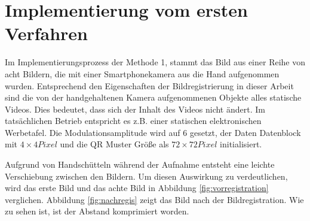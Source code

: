 \section{Implementierung vom ersten Verfahren}
Im Implementierungsprozess der Methode 1, stammt das Bild aus einer Reihe von acht Bildern, die mit einer Smartphonekamera aus die Hand aufgenommen wurden. Entsprechend den Eigenschaften der Bildregistrierung in dieser Arbeit sind die von der handgehaltenen Kamera aufgenommenen Objekte alles statische Videos. Dies bedeutet, dass sich der Inhalt des Videos nicht ändert. Im tatsächlichen Betrieb entspricht es z.B. einer statischen elektronischen Werbetafel. Die Modulationsamplitude wird auf 6 gesetzt, der Daten Datenblock mit $ 4 \times 4 Pixel$ und die QR Muster Größe als $ 72 \times 72 Pixel$ initialisiert.

Aufgrund von Handschütteln während der Aufnahme entsteht eine leichte Verschiebung zwischen den Bildern. Um diesen Auswirkung zu verdeutlichen, wird das erste Bild und das achte Bild in Abbildung \ref{fig:vorregistration} verglichen. 
Abbildung \ref{fig:nachregis} zeigt das Bild nach der Bildregistration. Wie zu sehen ist, ist der Abstand komprimiert worden. %
 
